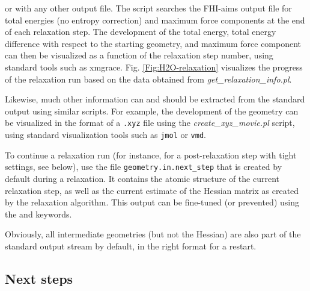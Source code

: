 or with any other output file. The script searches the FHI-aims output
file for total energies (no entropy correction) and maximum force
components at the end of each relaxation step. The development of the
total energy, total energy difference with respect to the starting
geometry, and maximum force component can then be visualized as a
function of the relaxation step number, using standard tools such as
xmgrace. Fig. \ref{Fig:H2O-relaxation} visualizes the progress of the
relaxation run based on the data obtained from
\emph{get\_relaxation\_info.pl}. 

Likewise, much other information can and should be extracted from the standard
output using similar scripts. For example, the development of the geometry can
be visualized in the format of a \texttt{.xyz} file using the
\emph{create\_xyz\_movie.pl} script, using standard visualization tools such
as \texttt{jmol} or \texttt{vmd}.

To continue a relaxation run (for instance, for a post-relaxation step
with tight settings, see below), use the file
\texttt{geometry.in.next\_step} that is created by default during a
relaxation. It contains the atomic structure of the current relaxation
step, as well as the current estimate of the Hessian matrix as created
by the  relaxation algorithm. This output can be
fine-tuned (or prevented) using the 
and  keywords.

Obviously, all intermediate geometries (but not the Hessian) are also
part of the standard output stream by default, in the right format for
a restart.

\subsection*{Next steps}

